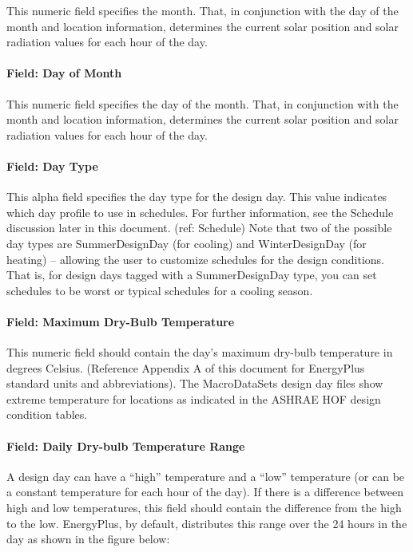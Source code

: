 This numeric field specifies the month. That, in conjunction with the day of the month and location information, determines the current solar position and solar radiation values for each hour of the day.

\paragraph{Field: Day of Month}\label{field-day-of-month}

This numeric field specifies the day of the month. That, in conjunction with the month and location information, determines the current solar position and solar radiation values for each hour of the day.

\paragraph{Field: Day Type}\label{field-day-type}

This alpha field specifies the day type for the design day. This value indicates which day profile to use in schedules. For further information, see the Schedule discussion later in this document. (ref: Schedule) Note that two of the possible day types are SummerDesignDay (for cooling) and WinterDesignDay (for heating) -- allowing the user to customize schedules for the design conditions. That is, for design days tagged with a SummerDesignDay type, you can set schedules to be worst or typical schedules for a cooling season.

\paragraph{Field: Maximum Dry-Bulb Temperature}\label{field-maximum-dry-bulb-temperature}

This numeric field should contain the day's maximum dry-bulb temperature in degrees Celsius. (Reference Appendix A of this document for EnergyPlus standard units and abbreviations). The MacroDataSets design day files show extreme temperature for locations as indicated in the ASHRAE HOF design condition tables.

\paragraph{Field: Daily Dry-bulb Temperature Range}\label{field-daily-dry-bulb-temperature-range}

A design day can have a ``high'' temperature and a ``low'' temperature (or can be a constant temperature for each hour of the day). If there is a difference between high and low temperatures, this field should contain the difference from the high to the low. EnergyPlus, by default, distributes this range over the 24 hours in the day as shown in the figure below:

